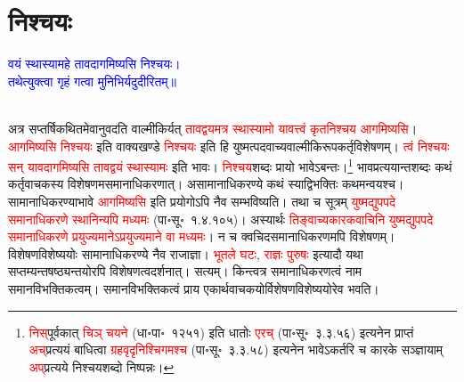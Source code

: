 \section[निश्चयः]{निश्चयः}
\centering\textcolor{blue}{वयं स्थास्यामहे तावदागमिष्यसि निश्चयः।\nopagebreak\\
तथेत्युक्त्वा गृहं गत्वा मुनिभिर्यदुदीरितम्॥}\nopagebreak\\
\\
\begin{sloppypar}\justifying\noindent\hspace{10mm} अत्र सप्तर्षि\-कथितमेवानुवदति वाल्मीकिर्यत् \textcolor{red}{तावद्वयमत्र स्थास्यामो यावत्त्वं कृत\-निश्चय आगमिष्यसि}। \textcolor{red}{आगमिष्यसि निश्चयः} इति वाक्य\-खण्डे \textcolor{red}{निश्चयः} इति हि युष्मत्पद\-वाच्य\-वाल्मीकि\-रूप\-कर्तृ\-विशेषणम्। \textcolor{red}{त्वं निश्चयः सन् यावदागमिष्यसि तावद्वयं स्थास्यामः} इति भावः। \textcolor{red}{निश्चय}\-शब्दः प्रायो भावेऽबन्तः।\footnote{\textcolor{red}{निस्‌}\-पूर्वकात् \textcolor{red}{चिञ् चयने} (धा॰पा॰~१२५१) इति धातोः \textcolor{red}{एरच्} (पा॰सू॰~३.३.५६) इत्यनेन प्राप्तं \textcolor{red}{अच्‌}\-प्रत्ययं बाधित्वा \textcolor{red}{ग्रहवृदृ\-निश्चिगमश्च} (पा॰सू॰~३.३.५८) इत्यनेन भावेऽकर्तरि च कारके सञ्ज्ञायाम् \textcolor{red}{अप्‌}\-प्रत्यये निश्चय\-शब्दो निष्पन्नः।
} भाव\-प्रत्ययान्त\-शब्दः कथं कर्तृ\-वाचकस्य विशेषणमसमानाधि\-करणात्। असामानाधि\-करण्ये कथं स्याद्विभक्तिः कथमन्वयश्च। सामानाधि\-करण्याभावे \textcolor{red}{आगमिष्यसि} इति प्रयोगोऽपि नैव सम्भविष्यति। तथा च सूत्रम् \textcolor{red}{युष्मद्युपपदे समानाधिकरणे स्थानिन्यपि मध्यमः} (पा॰सू॰~१.४.१०५)। अस्यार्थः \textcolor{red}{तिङ्वाच्य\-कारक\-वाचिनि युष्मद्युपपदे समानाधिकरणे प्रयुज्यमानेऽप्रयुज्यमाने वा मध्यमः}। न च क्वचिदसमानाधि\-करणमपि विशेषणम्। विशेषण\-विशेष्ययोः सामानाधिकरण्ये नैव राजाज्ञा। \textcolor{red}{भूतले घटः}, \textcolor{red}{राज्ञः पुरुषः} इत्यादौ यथा सप्तम्यन्त\-षष्ठ्यन्तयोरपि विशेषणत्व\-दर्शनात्। सत्यम्। किन्त्वत्र समानाधिकरणत्वं नाम समान\-विभक्तिकत्वम्। समान\-विभक्तिकत्वं प्राय एकार्थ\-वाचकयोर्विशेषण\-विशेष्ययोरेव भवति।

\end{sloppypar}
